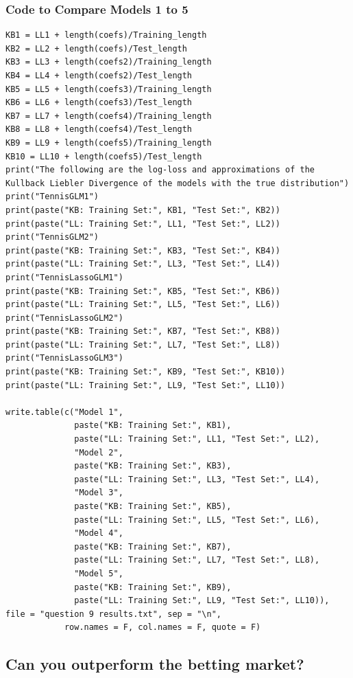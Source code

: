 \documentclass[11pt]{article} %
\begin{document}
\subsubsection*{Code to Compare Models 1 to 5}
\begin{lstlisting}
KB1 = LL1 + length(coefs)/Training_length
KB2 = LL2 + length(coefs)/Test_length
KB3 = LL3 + length(coefs2)/Training_length
KB4 = LL4 + length(coefs2)/Test_length
KB5 = LL5 + length(coefs3)/Training_length
KB6 = LL6 + length(coefs3)/Test_length
KB7 = LL7 + length(coefs4)/Training_length
KB8 = LL8 + length(coefs4)/Test_length
KB9 = LL9 + length(coefs5)/Training_length
KB10 = LL10 + length(coefs5)/Test_length
print("The following are the log-loss and approximations of the Kullback Liebler Divergence of the models with the true distribution")
print("TennisGLM1")
print(paste("KB: Training Set:", KB1, "Test Set:", KB2))
print(paste("LL: Training Set:", LL1, "Test Set:", LL2))
print("TennisGLM2")
print(paste("KB: Training Set:", KB3, "Test Set:", KB4))
print(paste("LL: Training Set:", LL3, "Test Set:", LL4))
print("TennisLassoGLM1")
print(paste("KB: Training Set:", KB5, "Test Set:", KB6))
print(paste("LL: Training Set:", LL5, "Test Set:", LL6))
print("TennisLassoGLM2")
print(paste("KB: Training Set:", KB7, "Test Set:", KB8))
print(paste("LL: Training Set:", LL7, "Test Set:", LL8))
print("TennisLassoGLM3")
print(paste("KB: Training Set:", KB9, "Test Set:", KB10))
print(paste("LL: Training Set:", LL9, "Test Set:", LL10))

write.table(c("Model 1",
              paste("KB: Training Set:", KB1),
              paste("LL: Training Set:", LL1, "Test Set:", LL2),
              "Model 2",
              paste("KB: Training Set:", KB3),
              paste("LL: Training Set:", LL3, "Test Set:", LL4),
              "Model 3",
              paste("KB: Training Set:", KB5),
              paste("LL: Training Set:", LL5, "Test Set:", LL6),
              "Model 4",
              paste("KB: Training Set:", KB7),
              paste("LL: Training Set:", LL7, "Test Set:", LL8),
              "Model 5",
              paste("KB: Training Set:", KB9),
              paste("LL: Training Set:", LL9, "Test Set:", LL10)), file = "question 9 results.txt", sep = "\n", 
            row.names = F, col.names = F, quote = F)
\end{lstlisting}
\subsection*{Can you outperform the betting market?}
\end{document}

